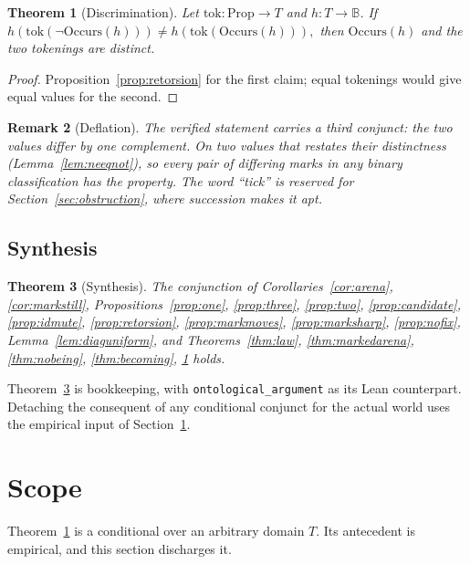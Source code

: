 \documentclass[11pt]{article}
\newtheorem{theorem}{Theorem}[section]
\newtheorem{remark}[theorem]{Remark}
\newcommand{\Occurs}{\mathrm{Occurs}}
\newcommand{\lf}[1]{\texttt{#1}}
\newcommand{\B}{\mathbb{B}}
\begin{document}
\begin{theorem}[Discrimination]
\label{thm:discrimination}
Let $\mathrm{tok} : \mathrm{Prop} \to T$ and $h : T \to \B$. If
\(
h(\mathrm{tok}(\lnot \Occurs(h))) \neq h(\mathrm{tok}(\Occurs(h))),
\)
then $\Occurs(h)$ and the two tokenings are distinct.
\end{theorem}

\begin{proof}
Proposition~\ref{prop:retorsion} for the first claim; equal tokenings would give equal values for the second.
\end{proof}

\begin{remark}[Deflation]
\label{rem:deflation}
The verified statement carries a third conjunct: the two values differ by one complement. On two values that restates their distinctness (Lemma~\ref{lem:neeqnot}), so every pair of differing marks in any binary classification has the property. The word ``tick'' is reserved for Section~\ref{sec:obstruction}, where succession makes it apt.
\end{remark}

\subsection{Synthesis}

\begin{theorem}[Synthesis]
\label{thm:main}
The conjunction of Corollaries~\ref{cor:arena}, \ref{cor:markstill}, Propositions~\ref{prop:one}, \ref{prop:three}, \ref{prop:two}, \ref{prop:candidate}, \ref{prop:idmute}, \ref{prop:retorsion}, \ref{prop:markmoves}, \ref{prop:marksharp}, \ref{prop:nofix}, Lemma~\ref{lem:diaguniform}, and Theorems~\ref{thm:law}, \ref{thm:markedarena}, \ref{thm:nobeing}, \ref{thm:becoming}, \ref{thm:discrimination} holds.
\end{theorem}

Theorem~\ref{thm:main} is bookkeeping, with \lf{ontological\_argument} as its Lean counterpart. Detaching the consequent of any conditional conjunct for the actual world uses the empirical input of Section~\ref{sec:scope}.

\section{Scope}
\label{sec:scope}

Theorem~\ref{thm:discrimination} is a conditional over an arbitrary domain $T$. Its antecedent is empirical, and this section discharges it.
\end{document}
